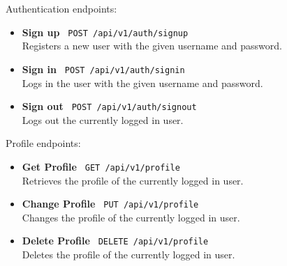 \documentclass[a4paper,12pt]{article}
\begin{document}
	Authentication endpoints:
	\begin{itemize}
		\item \textbf{Sign up} \texttt{ POST /api/v1/auth/signup } \\
		Registers a new user with the given username and password.
		\item \textbf{Sign in} \texttt{ POST /api/v1/auth/signin } \\
		Logs in the user with the given username and password.
		\item \textbf{Sign out} \texttt{ POST /api/v1/auth/signout } \\
		Logs out the currently logged in user.
	\end{itemize}

	Profile endpoints:
	\begin{itemize}
		\item \textbf{Get Profile} \texttt{ GET /api/v1/profile } \\
		Retrieves the profile of the currently logged in user.
		\item \textbf{Change Profile} \texttt{ PUT /api/v1/profile } \\
		Changes the profile of the currently logged in user.
		\item \textbf{Delete Profile} \texttt{ DELETE /api/v1/profile } \\
		Deletes the profile of the currently logged in user.
	\end{itemize}

	\newpage
\end{document}
